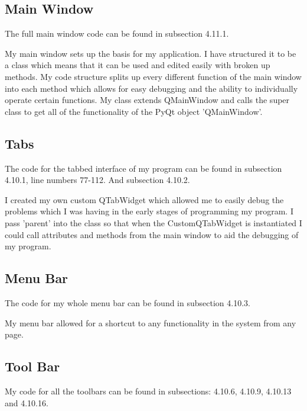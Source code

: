 \subsection{Main Window}

The full main window code can be found in subsection 4.11.1.


My main window sets up the basis for my application. I have structured it to be a class which means that it can be used and edited easily with broken up methods. My code structure splits up every different function of the main window into each method which allows for easy debugging and the ability to individually operate certain functions. My class extends QMainWindow and calls the super class to get all of the functionality of the PyQt object 'QMainWindow'.


\subsection{Tabs}

The code for the tabbed interface of my program can be  found in subsection 4.10.1, line numbers 77-112. And subsection 4.10.2.


I created my own custom QTabWidget which allowed me to easily debug the problems which I was having in the early stages of programming my program. I pass 'parent' into the class so that when the CustomQTabWidget is instantiated I could call attributes and methods from the main window to aid the debugging of my program.
\subsection{Menu Bar}

The code for my whole menu bar can be found in subsection 4.10.3.

My menu bar allowed for a shortcut to any functionality in the system from any page.

\subsection{Tool Bar}

My code for all the toolbars can be found in subsections: 4.10.6, 4.10.9, 4.10.13 and 4.10.16.


